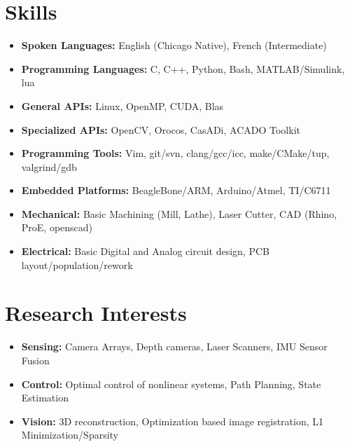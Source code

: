 \documentclass[line,lm,rm,11pt]{res} %
\def\spaceline{\vspace{1mm} \fullline}
\begin{document}
\begin{resume}
\section{Skills}
	\begin{itemize}
	\item 
	\spaceline
{\bf Spoken Languages: } English (Chicago Native), French (Intermediate)
\item {\bf Programming Languages: } C, C++, Python, Bash, MATLAB/Simulink, lua
\item {\bf General APIs: } Linux, OpenMP, CUDA, Blas
\item {\bf Specialized APIs: } OpenCV, Orocos, CasADi, ACADO Toolkit
\item {\bf Programming Tools: } Vim, git/svn, clang/gcc/icc, make/CMake/tup, valgrind/gdb
\item {\bf Embedded Platforms: } BeagleBone/ARM, Arduino/Atmel, TI/C6711
\item {\bf Mechanical: } Basic Machining (Mill, Lathe), Laser Cutter, CAD (Rhino, ProE, openscad)
\item {\bf Electrical: } Basic Digital and Analog circuit design, PCB layout/population/rework
\end{itemize}

\section{Research Interests}
\begin{itemize}
\item 
	\spaceline
	{\bf Sensing:} Camera Arrays, Depth cameras, Laser Scanners, IMU Sensor Fusion
\item 
	{\bf Control:} Optimal control of nonlinear systems, Path Planning, State Estimation
\item 
	{\bf Vision:} 3D reconstruction, Optimization based image registration, L1 Minimization/Sparsity
\end{itemize}


\end{resume}
\end{document}
